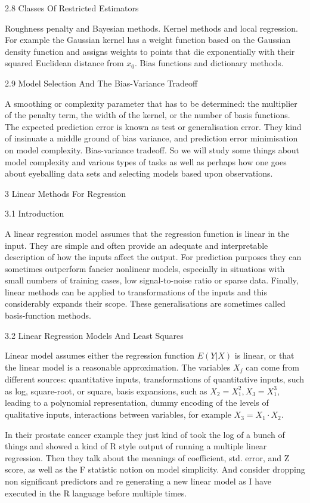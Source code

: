 2.8 Classes Of Restricted Estimators

Roughness penalty and Bayesian methods. Kernel methods and local regression. For example the Gaussian kernel has a weight function based on the Gaussian density function and assigns weights to points that die exponentially with their squared Euclidean distance from $x_0$. Bias functions and dictionary methods.

2.9 Model Selection And The Bias-Variance Tradeoff

A smoothing or complexity parameter that has to be determined: the multiplier of the penalty term, the width of the kernel, or the number of basis functions. The expected prediction error is known as test or generalisation error. They kind of insinuate a middle ground of bias variance, and prediction error minimisation on model complexity. Bias-variance tradeoff. So we will study some things about model complexity and various types of tasks as well as perhaps how one goes about eyeballing data sets and selecting models based upon observations.

3 Linear Methods For Regression

3.1 Introduction

A linear regression model assumes that the regression function is linear in the input. They are simple and often provide an adequate and interpretable description of how the inputs affect the output. For prediction purposes they can sometimes outperform fancier nonlinear models, especially in situations with small numbers of training cases, low signal-to-noise ratio or sparse data. Finally, linear methods can be applied to transformations of the inputs and this considerably expands their scope. These generalisations are sometimes called basis-function methods.

3.2 Linear Regression Models And Least Squares

Linear model assumes either the regression function $E(Y|X)$ is linear, or that the linear model is a reasonable approximation. The variables $X_j$ can come from different sources: quantitative inputs, transformations of quantitative inputs, such as log, square-root, or square, basis expansions, such as $X_2 = X_1^2, X_3 = X_1^3$, leading to a polynomial representation, dummy encoding of the levels of qualitative inputs, interactions between variables, for example $X_3 = X_1 \cdot X_2$.

In their prostate cancer example they just kind of took the log of a bunch of things and showed a kind of R style output of running a multiple linear regression. Then they talk about the meanings of coefficient, std. error, and Z score, as well as the F statistic notion on model simplicity. And consider dropping non significant predictors and re generating a new linear model as I have executed in the R language before multiple times.

